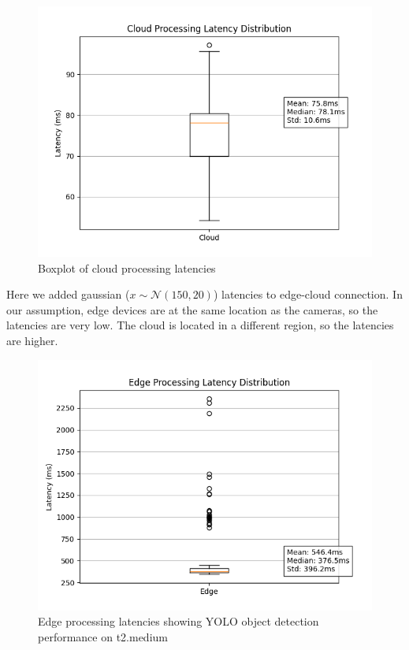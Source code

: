 \documentclass[conference]{IEEEtran}
\begin{document}
\begin{figure}[!h]
    \centering
    \includegraphics[width=1\linewidth]{./res/evaluation_without_latencies/cloud_latencies_old.png}
    \caption{Boxplot of cloud processing latencies}
    \label{fig:cloud_latencies_old}
\end{figure}

Here we added gaussian  ($x \sim \mathcal{N}(150, 20)$) latencies to edge-cloud connection. In our assumption, edge devices are at the same location as the cameras, so the latencies are very low. The cloud is located in a different region, so the latencies are higher. 


\begin{figure}[h!]
    \centering
    \includegraphics[width=1\linewidth]{./res/evaluation_with_latencies/edge_latencies.png}
    \caption{Edge processing latencies showing YOLO object detection performance on t2.medium }
    \label{fig:edge_latencies}
\end{figure}
\end{document}
